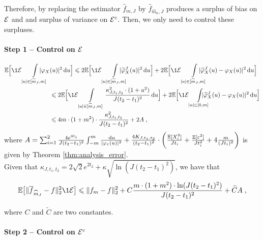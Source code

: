 Therefore, by replacing the estimator $\hat f_{m, J}$ by $\hat f_{\hat m_n, J}$ produces a surplus of bias on $\mathcal{E}$ and and surplus of variance on $\mathcal{E}^c$. Then, we only need to control these surpluses.
\paragraph{\textbf{Step 1} -- Control on $\mathcal{E}$}

\begin{align*}
    \EE \Big[ \1{\Ecal} \int\limits_{|u| \in [\hat m_J, m]}\hspace{-15pt} |\varphi_X &(u)|^2 \du \Big]
    \leq 2 \EE \Big[ \1{\Ecal} \int\limits_{|u| \in [\hat m_J, m]}\hspace{-15pt} |\tilde \varphi_X^J(u)|^2 \du \Big] + 2 \EE \Big[ \1{\Ecal} \int\limits_{|u| \in [\hat m_J, m]}\hspace{-15pt} |\tilde \varphi_X^J(u) - \varphi_X(u)|^2 \du \Big] \\
    &\leq  2 \EE \Big[ \1{\Ecal} \int\limits_{|u| \in [\hat m_J, m]} \frac{\kappa_{J, t_1, t_2}^2 \cdot (1 + u^2)}{J ( t_2 - t_1)^2} \du \Big] +  2 \EE \Big[ \1{\Ecal} \int\limits_{|u| \in [0, m]}\hspace{-15pt} |\tilde \varphi_X^J(u) - \varphi_X(u)|^2 \du \Big] \\
    &\leq 4m \cdot(1 + m^2)\cdot \frac{\kappa_{J, t_1, t_2}^2}{J ( t_2 - t_1)^2} + 2A
    \eqfinv
\end{align*}
where $A = \sum_{i = 1}^2 \frac{4 e^{4t_i}}{J (t_2 - t_1)^2} \int_{-m}^{m} \frac{\, \mathrm du}{|\varphi_{\varepsilon}(u)|^2}
		+\frac{4 K_{J, t_1, t_2}}{(t_2 - t_1)^2} 
	 \cdot \bigg( \frac{\mathbb{E}[X_i^2]}{J t_i} 
			+ \frac{\mathbb{E}[\varepsilon^2]}{J t_i^2} + 4 \frac{m}{(J t_i)^2} \bigg)$
is given by Theorem \ref{thm:analysis_error}. \\
    
Given that $ \kappa_{J, t_1, t_2} = 2 \sqrt{2} e^{2 t_2} + \kappa \sqrt{\ln(J ( t_2 - t_1)^2)} $, we have that 
    \begin{equation*}
     \EE \big[ \norm{\bar f_{\hat m_J} - f }^2 \1{\Ecal} \big] 
     \leq 
     \norm{f_m - f}^2 + C \frac{m \cdot(1 + m^2) \cdot \ln(J ( t_2 - t_1)^2) }{J ( t_2 - t_1)^2} + \tilde C A
     \eqfinv
    \end{equation*}

where $C$ and $\tilde C$ are two constantes.
    
\paragraph{\textbf{Step 2} -- Control on $\mathcal{E}^c$}

